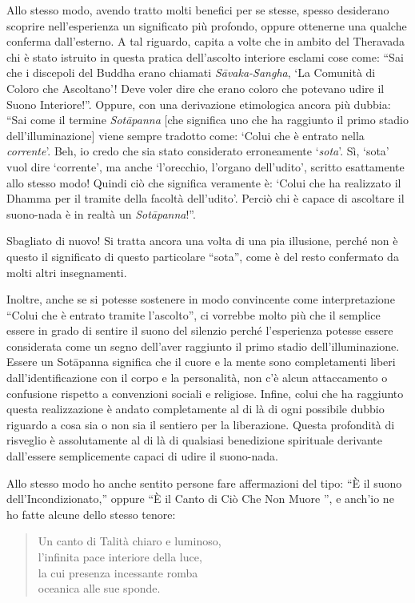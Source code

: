 Allo stesso modo, avendo tratto molti benefici per se stesse, spesso
desiderano scoprire nell'esperienza un significato più profondo, oppure
ottenerne una qualche conferma dall'esterno. A tal riguardo, capita a
volte che in ambito del Theravada chi è stato istruito in questa pratica
dell'ascolto interiore esclami cose come: ``Sai che i discepoli del
Buddha erano chiamati \emph{Sāvaka-Sangha}, `La Comunità di Coloro che
Ascoltano'! Deve voler dire che erano coloro che potevano udire il Suono
Interiore!''. Oppure, con una derivazione etimologica ancora più dubbia:
``Sai come il termine \emph{Sotāpanna} [che significa uno che ha
raggiunto il primo stadio dell'illuminazione] viene sempre tradotto
come: `Colui che è entrato nella \emph{corrente}'. Beh, io credo che sia
stato considerato erroneamente `\emph{sota}'. Sì, `sota' vuol dire
`corrente', ma anche `l'orecchio, l'organo dell'udito', scritto
esattamente allo stesso modo! Quindi ciò che significa veramente è:
`Colui che ha realizzato il Dhamma per il tramite della facoltà
dell'udito'. Perciò chi è capace di ascoltare il suono-nada è in realtà
un \emph{Sotāpanna}!''.

Sbagliato di nuovo! Si tratta ancora una volta di una pia illusione,
perché non è questo il significato di questo particolare ``sota'', come
è del resto confermato da molti altri insegnamenti.\cite{ensinamentos}

Inoltre, anche se si potesse sostenere in modo convincente come
interpretazione ``Colui che è entrato tramite l'ascolto'', ci vorrebbe
molto più che il semplice essere in grado di sentire il suono del
silenzio perché l'esperienza potesse essere considerata come un segno
dell'aver raggiunto il primo stadio dell'illuminazione. Essere un
Sotāpanna significa che il cuore e la mente sono completamenti liberi
dall'identificazione con il corpo e la personalità, non c'è alcun
attaccamento o confusione rispetto a convenzioni sociali e religiose.
Infine, colui che ha raggiunto questa realizzazione è andato
completamente al di là di ogni possibile dubbio riguardo a cosa sia o
non sia il sentiero per la liberazione. Questa profondità di risveglio è
assolutamente al di là di qualsiasi benedizione spirituale derivante
dall'essere semplicemente capaci di udire il suono-nada.

Allo stesso modo ho anche sentito persone fare affermazioni del tipo:
``È il suono dell'Incondizionato,'' oppure ``È il Canto di Ciò Che Non
Muore '', e anch'io ne ho fatte alcune dello stesso tenore:

\begin{quotation}
Un canto di Talità chiaro e luminoso,\\
l'infinita pace interiore della luce,\\
la cui presenza incessante romba\\
oceanica alle sue
sponde.\cite{portrait}
\end{quotation}


